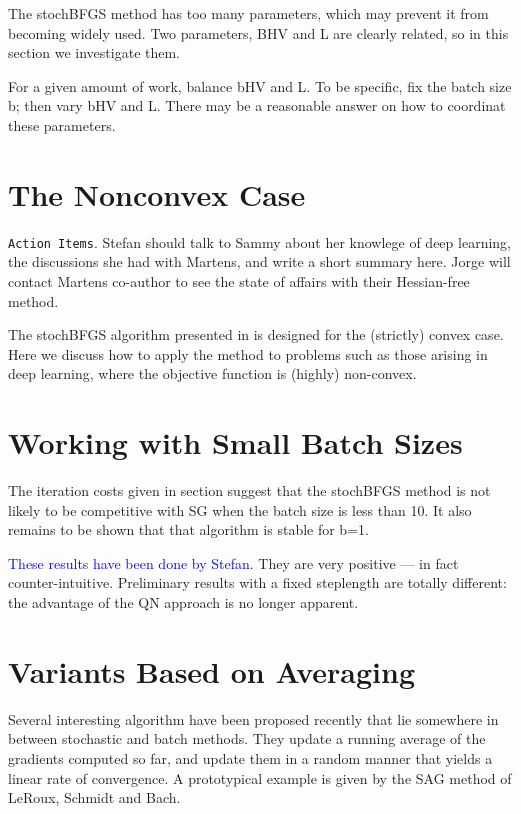 \documentclass[12pt]{article}
\begin{document}
The stochBFGS method has too many parameters, which may prevent it from becoming widely used. Two parameters, BHV and L are clearly related, so in this section we investigate them.

For a given amount of work, balance bHV and L. To be specific, fix the batch size b; then vary bHV and L. There may be a reasonable answer on how to coordinat these parameters.

\section{The Nonconvex Case}
\label{nonconvex}

{\tt Action Items}. Stefan should talk to Sammy about her knowlege of deep learning, the discussions she had with Martens, and write a short summary here. Jorge will contact Martens co-author to see the state of affairs with their Hessian-free method.

The stochBFGS algorithm presented in \cite{sammy} is designed for the (strictly) convex case. Here we discuss how to apply the
method to problems such as those arising in deep learning, where the objective function is (highly) non-convex.

\section{Working with Small Batch Sizes}
\label{smallb}

The iteration costs given in section suggest that the stochBFGS method is not likely to be competitive with SG when the batch size is less than 10. It also remains to be shown that that algorithm is stable for b=1. 

\textcolor{blue}{These results have been done by Stefan}. They are very positive --- in fact counter-intuitive. Preliminary results with a fixed steplength are totally different: the advantage of the QN approach is no longer apparent.

\section{Variants Based on Averaging}
\label{averaging}

Several interesting algorithm have been proposed recently that lie somewhere in between stochastic and batch methods. They update a running average of the gradients computed so far, and update them in a random manner that yields a linear rate of convergence. A prototypical example is given by the SAG method of LeRoux, Schmidt and Bach.
\end{document}
